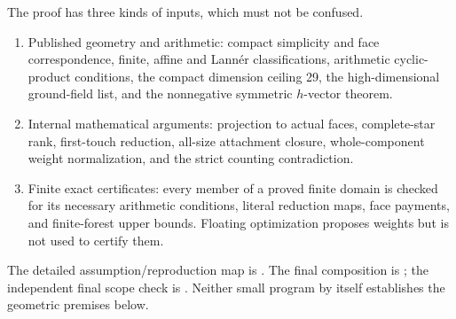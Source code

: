 \documentclass[11pt]{article}
\begin{document}
The proof has three kinds of inputs, which must not be confused.
\begin{enumerate}
\item Published geometry and arithmetic: compact simplicity and face
correspondence, finite, affine and Lann\'er classifications, arithmetic cyclic-product
conditions, the compact dimension ceiling 29, the high-dimensional ground-field
list, and the nonnegative symmetric $h$-vector theorem.
\item Internal mathematical arguments: projection to actual faces,
complete-star rank, first-touch reduction, all-size attachment closure,
whole-component weight normalization, and the strict counting contradiction.
\item Finite exact certificates: every member of a proved finite domain is
checked for its necessary arithmetic conditions, literal reduction maps,
face payments, and finite-forest upper bounds. Floating optimization proposes
weights but is not used to certify them.
\end{enumerate}
The detailed assumption/reproduction map is
. The final composition is
; the
independent final scope check is
.
Neither small program by itself establishes the geometric premises below.
\end{document}
